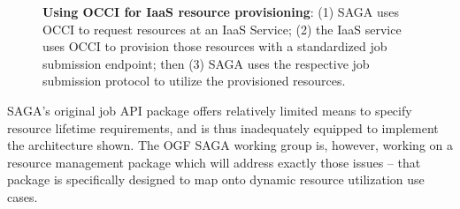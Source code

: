 \documentclass[10pt,conference,final,letterpaper,twoside,twocolumn,]{IEEEtran}
\newcommand{\B}[1]{\textbf{#1}}
\begin{document}
 \begin{figure}[h!]
  \caption{\footnotesize\label{fig:arch2} \B{Using OCCI for IaaS resource provisioning}: 
     (1) SAGA uses OCCI to request resources at an IaaS Service; 
     (2) the IaaS service uses OCCI to provision those resources 
          with a standardized job submission endpoint; then 
     (3) SAGA uses the respective job submission protocol to utilize 
     the provisioned resources.}
 \end{figure}

 SAGA's original job API package offers relatively limited means to
 specify resource lifetime requirements, and is thus inadequately
 equipped to implement the architecture shown.  The OGF SAGA working
 group is, however, working on a resource management package which
 will address exactly those issues -- that package is specifically
 designed to map onto dynamic resource utilization use cases.
\end{document}
